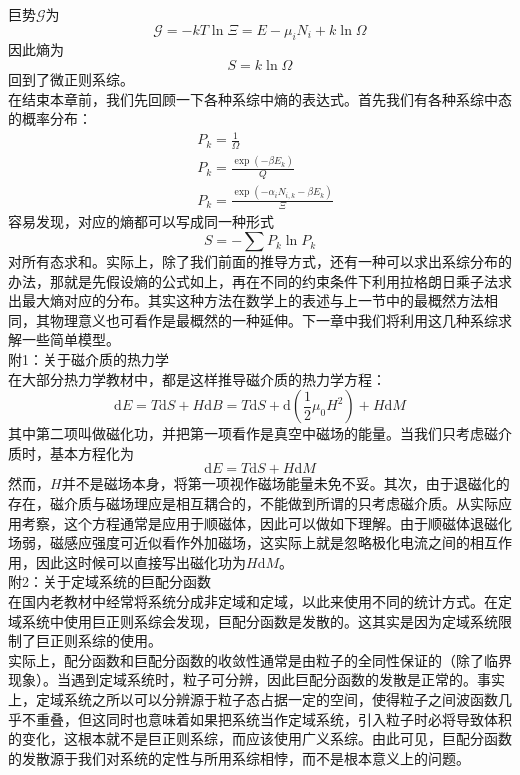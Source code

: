 \documentclass[hyperref,UTF8]{ctexbook}
\begin{document}
巨势$\mathscr{G}$为
\[\mathscr{G}=-kT\ln\Xi=E-\mu_i N_i+k\ln\Omega\]
因此熵为
\[S=k\ln\Omega\]
回到了微正则系综。\\
\indent 在结束本章前，我们先回顾一下各种系综中熵的表达式。首先我们有各种系综中态的概率分布：
\begin{align*}
	&P_k=\frac{1}{\Omega}\\
	&P_k=\frac{\exp(-\beta E_k)}{Q}\\
	&P_k=\frac{\exp(-\alpha_i N_{i,k}-\beta E_k)}{\Xi}
\end{align*}
容易发现，对应的熵都可以写成同一种形式
\[S=-\sum P_k\ln P_k\]
对所有态求和。实际上，除了我们前面的推导方式，还有一种可以求出系综分布的办法，那就是先假设熵的公式如上，再在不同的约束条件下利用拉格朗日乘子法求出最大熵对应的分布。其实这种方法在数学上的表述与上一节中的最概然方法相同，其物理意义也可看作是最概然的一种延伸。下一章中我们将利用这几种系综求解一些简单模型。\\
{附1：关于磁介质的热力学\\
\indent 在大部分热力学教材中，都是这样推导磁介质的热力学方程：
\[\mathrm{d}E=T\mathrm{d}S+H\mathrm{d}B=T\mathrm{d}S+\mathrm{d}\left(\frac{1}{2}\mu_0H^2\right)+H\mathrm{d}M\]
其中第二项叫做磁化功，并把第一项看作是真空中磁场的能量。当我们只考虑磁介质时，基本方程化为
\[\mathrm{d}E=T\mathrm{d}S+H\mathrm{d}M\]
\indent 然而，$H$并不是磁场本身，将第一项视作磁场能量未免不妥。其次，由于退磁化的存在，磁介质与磁场理应是相互耦合的，不能做到所谓的只考虑磁介质。从实际应用考察，这个方程通常是应用于顺磁体，因此可以做如下理解。由于顺磁体退磁化场弱，磁感应强度可近似看作外加磁场，这实际上就是忽略极化电流之间的相互作用，因此这时候可以直接写出磁化功为$H\mathrm{d}M$。\\
}
{附2：关于定域系统的巨配分函数\\
\indent 在国内老教材中经常将系统分成非定域和定域，以此来使用不同的统计方式。在定域系统中使用巨正则系综会发现，巨配分函数是发散的。这其实是因为定域系统限制了巨正则系综的使用。\\
\indent 实际上，配分函数和巨配分函数的收敛性通常是由粒子的全同性保证的（除了临界现象）。当遇到定域系统时，粒子可分辨，因此巨配分函数的发散是正常的。事实上，定域系统之所以可以分辨源于粒子态占据一定的空间，使得粒子之间波函数几乎不重叠，但这同时也意味着如果把系统当作定域系统，引入粒子时必将导致体积的变化，这根本就不是巨正则系综，而应该使用广义系综。由此可见，巨配分函数的发散源于我们对系统的定性与所用系综相悖，而不是根本意义上的问题。\\
}
\end{document}
